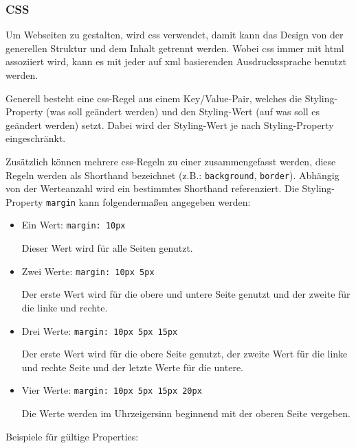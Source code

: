 \subsubsection{CSS}

Um Webseiten zu gestalten, wird \gls{css} verwendet, damit kann das Design von der generellen Struktur und dem Inhalt getrennt werden. Wobei \gls{css} immer mit \gls{html} assoziiert wird, kann es mit jeder auf \gls{xml} basierenden Ausdruckssprache benutzt werden. \cite{HTML-CSS}

Generell besteht eine \gls{css}-Regel aus einem Key/Value-Pair, welches die Styling-Property (was soll geändert werden) und den Styling-Wert (auf was soll es geändert werden) setzt. Dabei wird der Styling-Wert je nach Styling-Property eingeschränkt.

Zusätzlich können mehrere \gls{css}-Regeln zu einer zusammengefasst werden, diese Regeln werden als Shorthand bezeichnet (z.B.: \lstinline{background}, \lstinline{border}). Abhängig von der Werteanzahl wird ein bestimmtes Shorthand referenziert. Die Styling-Property \lstinline{margin} kann folgendermaßen angegeben werden:

\begin{itemize}
    \item Ein Wert: \lstinline{margin: 10px}

          Dieser Wert wird für alle Seiten genutzt.
    \item Zwei Werte: \lstinline{margin: 10px 5px}

          Der erste Wert wird für die obere und untere Seite genutzt und der zweite für die linke und rechte.
    \item Drei Werte:  \lstinline{margin: 10px 5px 15px}

          Der erste Wert wird für die obere Seite genutzt, der zweite Wert für die linke und rechte Seite und der letzte Werte für die untere.
    \item Vier Werte: \lstinline{margin: 10px 5px 15px 20px}

          Die Werte werden im Uhrzeigersinn beginnend mit der oberen Seite vergeben.
\end{itemize}

Beispiele für gültige Properties:

